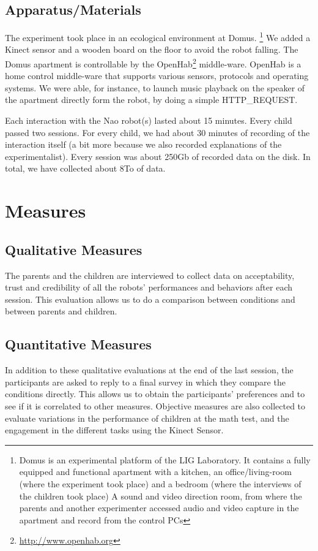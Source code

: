 \documentclass[a4paper,twocolumn]{svjour3}
\begin{document}
\subsection{Apparatus/Materials}
The experiment took place in an ecological environment at Domus.
\footnote{Domus is an experimental platform of the LIG Laboratory.
	It contains a fully equipped and functional apartment with a kitchen, an office/living-room (where the experiment took place) and  a bedroom (where the interviews of the children took place)
	A sound and video direction room, from where the parents and another experimenter accessed audio and video capture in the apartment and record from the control PCs}
We added a Kinect sensor and a wooden board on the floor to avoid the robot falling. 
The Domus apartment is controllable by the OpenHab\footnote{\url{http://www.openhab.org}} middle-ware. 
OpenHab is a home control middle-ware that supports various sensors, protocols and operating systems. 
We were able, for instance, to launch music playback on the speaker of the apartment directly form the robot, by doing a simple HTTP\_REQUEST. 

Each interaction with the Nao robot(s) lasted about 15 minutes. 
Every child passed two sessions. 
For every child, we had about 30 minutes of recording of the interaction itself (a bit more because we also recorded explanations of the experimentalist). 
Every session was about 250Gb of recorded data on the disk. 
In total, we have collected about 8To of data. 


\section{Measures}
\subsection{Qualitative Measures}
The parents and the children are interviewed to collect data on acceptability, trust and  credibility of all the robots' performances and behaviors after each session. 
This evaluation allows us to do a comparison between conditions and between parents and children.

\subsection{Quantitative Measures}
In addition to these qualitative evaluations at the end of the last session, the participants are asked to reply to a final survey in which they compare the conditions directly. 
This allows us to obtain the participants' preferences and to see if it is correlated to other measures. 
Objective measures are also collected to evaluate variations in the performance of children at the math test, and the engagement in the different tasks using the Kinect Sensor.
\end{document}
